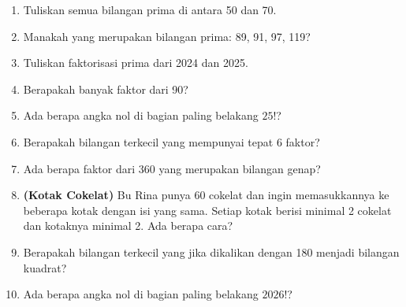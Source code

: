 \documentclass[11pt,a4paper]{article}
\begin{document}
\begin{enumerate}
    \item Tuliskan semua bilangan prima di antara 50 dan 70.
    \item Manakah yang merupakan bilangan prima: 89, 91, 97, 119?
    \item Tuliskan faktorisasi prima dari 2024 dan 2025.
    \item Berapakah banyak faktor dari 90?
    \item Ada berapa angka nol di bagian paling belakang $25!$?
\end{enumerate}

\begin{enumerate}
    \setcounter{enumi}{5}
    \item Berapakah bilangan terkecil yang mempunyai tepat 6 faktor?
    \item Ada berapa faktor dari 360 yang merupakan bilangan genap?
    \item \textbf{(Kotak Cokelat)} Bu Rina punya 60 cokelat dan ingin memasukkannya ke beberapa
          kotak dengan isi yang sama. Setiap kotak berisi minimal 2 cokelat dan kotaknya minimal 2.
          Ada berapa cara?
    \item Berapakah bilangan terkecil yang jika dikalikan dengan 180 menjadi bilangan kuadrat?
    \item Ada berapa angka nol di bagian paling belakang $2026!$?
\end{enumerate}
\end{document}
